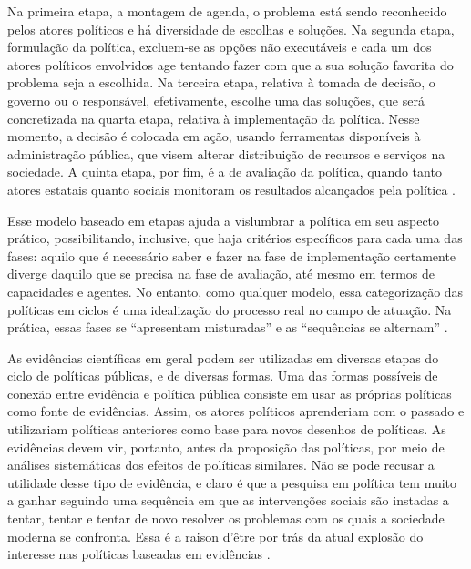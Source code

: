 Na primeira etapa, a montagem de agenda, o problema está sendo reconhecido pelos atores políticos e há diversidade de escolhas e soluções. Na segunda etapa, formulação da política, excluem-se as opções não executáveis e cada um dos atores políticos envolvidos age tentando fazer com que a sua solução favorita do problema seja a escolhida. Na terceira etapa, relativa à tomada de decisão, o governo ou o responsável, efetivamente, escolhe uma das soluções, que será concretizada na quarta etapa, relativa à implementação da política. Nesse momento, a decisão é colocada em ação, usando ferramentas disponíveis à administração pública, que visem alterar distribuição de recursos e serviços na sociedade. A quinta etapa, por fim, é a de avaliação da política, quando tanto atores estatais quanto sociais monitoram os resultados alcançados pela política \cite{de2018politicas}.

Esse modelo baseado em etapas ajuda a vislumbrar a política em seu aspecto prático, possibilitando, inclusive, que haja critérios específicos para cada uma das fases: aquilo que é necessário saber e fazer na fase de implementação certamente diverge daquilo que se precisa na fase de avaliação, até mesmo em termos de capacidades e agentes. No entanto, como qualquer modelo, essa categorização das políticas em ciclos é uma idealização do processo real no campo de atuação. Na prática, essas fases se “apresentam misturadas” e as
“sequências se alternam” \cite{de2018politicas}.

As evidências científicas em geral podem ser utilizadas em diversas etapas do ciclo de políticas públicas, e de diversas formas. Uma das formas possíveis de conexão entre evidência e política pública consiste em usar as próprias políticas como fonte de evidências. Assim, os atores políticos aprenderiam com o passado e utilizariam políticas anteriores como base para novos desenhos de políticas. As evidências devem vir, portanto, antes da proposição das políticas, por meio de análises sistemáticas dos efeitos de políticas similares.
Não se pode recusar a utilidade desse tipo de evidência, e claro é que a pesquisa em política tem muito a ganhar seguindo uma sequência em que as intervenções sociais são instadas a tentar, tentar e tentar de novo resolver os problemas com os quais a sociedade moderna se confronta. Essa é a raison d’être por trás da atual explosão do interesse nas políticas baseadas em evidências \cite{de2018politicas}.

